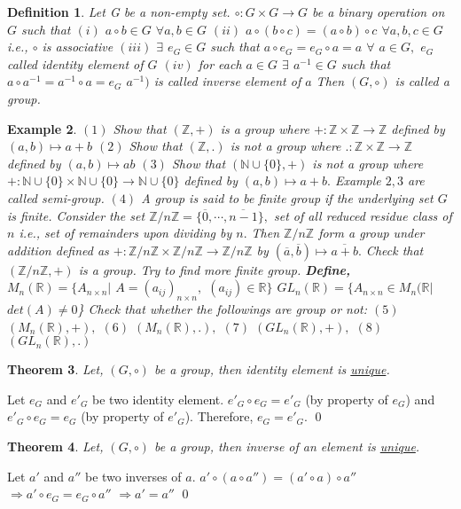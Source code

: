 \documentclass[11pt]{amsart}
\newtheorem{theorem}{Theorem}[section]
\newtheorem{definition}[theorem]{Definition}%
\newtheorem{example}[theorem]{Example}%
\newcommand{\ZZ}{\mathbb Z}
\newcommand{\RR}{\mathbb R}
\newcommand{\NN}{\mathbb N}
\begin{document}
\begin{definition}
Let G be a non-empty set. $\circ :G\times G \rightarrow G$ be a binary operation on $G$ such that 
\newline $(i)$ $a\circ b \in G$ $\forall a,b \in G$
\newline $(ii)$ $a\circ (b\circ c)=(a\circ b)\circ c$ $\forall a,b,c \in G$ i.e., $\circ$ is associative
\newline $(iii)$ $\exists$ $e_{G} \in G$ such that $a\circ e_{G}=e_{G}\circ a=a$ $\forall$ $a \in G,$ $e_{G}$ called identity element of $G$
\newline $(iv)$ for each $a\in G$ $\exists$ $a^{-1} \in G$ such that $a\circ a^{-1}=a^{-1}\circ a=e_{G}$ $a^{-1})$ is called inverse element of $a$ 
\newline Then $(G, \circ)$ is called a group.
\end{definition}
\begin{example} 
$(1)$ Show that $({\ZZ}, +)$ is a group where $+: {\ZZ}\times{\ZZ} \rightarrow {\ZZ}$ defined by $(a,b)\mapsto a+b$
\newline $(2)$ Show that $({\ZZ}, .)$ is not a group where $.: {\ZZ}\times{\ZZ} \rightarrow {\ZZ}$ defined by $(a,b)\mapsto ab$
\newline $(3)$  Show that $({\NN}\cup\{0\}, +)$ is not a group where $+: {\NN}\cup\{0\}\times{\NN}\cup\{0\} \rightarrow {\NN}\cup\{0\}$ defined by $(a,b)\mapsto a+b.$ Example $2,3$ are called semi-group.
\newline $(4)$ A group is said to be finite group if the underlying set $G$ is finite. Consider the set ${\ZZ}/n{\ZZ}=\{ \overline{0},\cdots,\overline{n-1}\},$ set of all reduced residue class of $n$ i.e., set of remainders upon dividing by $n.$ Then ${\ZZ}/n{\ZZ}$ form a group under addition defined as $+: {\ZZ}/n{\ZZ} \times {\ZZ}/n{\ZZ} \rightarrow {\ZZ}/n{\ZZ}$ by $(\overline{a},\overline{b})\mapsto \overline{a+b}.$ Check that $({\ZZ}/n{\ZZ}, +)$ is a group. Try to find more finite group.
\newline \textbf{Define,} $M_{n}({\RR})=\{A_{n\times n} |$ $A=(a_{ij})_{n\times n},$ $(a_{ij}) \in {\RR} \}$
\newline $GL_{n}({\RR})=\{A_{n\times n}\in M_{n}({\RR} |$ $det(A) \neq 0$\}
\newline Check that whether the followings are group or not:
\newline $(5)$ $(M_{n}({\RR}),+),$ $(6)$ $(M_{n}({\RR}),.),$ $(7)$ $(GL_{n}({\RR}),+),$ $(8)$ $(GL_{n}({\RR}),.)$
\end{example} 
\begin{theorem}
Let, $(G, \circ)$ be a group, then identity element is \underline{unique}.
\end{theorem}
\proof Let $e_{G}$ and $e'_{G}$ be two identity element. $e'_{G} \circ e_{G}=e'_{G}$ (by property of $e_{G}$) and $e'_{G} \circ e_{G}=e_{G}$ (by property of $e'_{G}$). Therefore, $e_{G}=e'_{G}.$ \qed
\begin{theorem}
Let, $(G, \circ)$ be a group, then inverse of an element is \underline{unique}.
\end{theorem}
\proof Let $a'$ and $a''$ be two inverses of $a$. $a'\circ(a\circ a'')=(a'\circ a)\circ a''$ $\Rightarrow a'\circ e_{G}=e_{G}\circ a''$ $\Rightarrow a'=a''$ \qed
\end{document}
